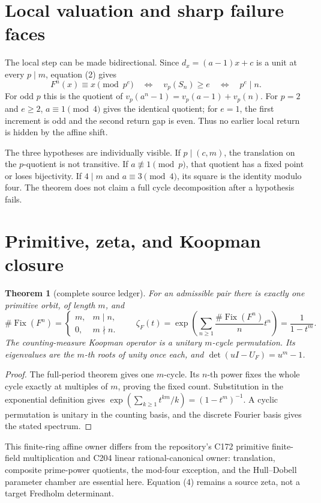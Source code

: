 \documentclass[10pt]{article}
\newtheorem{theorem}{Theorem}
\begin{document}
\section{Local valuation and sharp failure faces}
The local step can be made bidirectional.  Since
$d_x=(a-1)x+c$ is a unit at every $p\mid m$, equation (2) gives
\[
 F^n(x)\equiv x\pmod {p^e}
 \quad\Longleftrightarrow\quad v_p(S_n)\ge e
 \quad\Longleftrightarrow\quad p^e\mid n.             \tag{3}
\]
For odd $p$ this is the quotient of
$v_p(a^n-1)=v_p(a-1)+v_p(n)$.  For $p=2$ and $e\ge2$,
$a\equiv1\pmod4$ gives the identical quotient; for $e=1$, the first
increment is odd and the second return gap is even.  Thus no earlier local
return is hidden by the affine shift.

The three hypotheses are individually visible.  If $p\mid(c,m)$, the
translation on the $p$-quotient is not transitive.  If
$a\not\equiv1\pmod p$, that quotient has a fixed point or loses
bijectivity.  If $4\mid m$ and $a\equiv3\pmod4$, its square is the identity
modulo four.  The theorem does not claim a full cycle decomposition after a
hypothesis fails.

\section{Primitive, zeta, and Koopman closure}
\begin{theorem}[complete source ledger]
For an admissible pair there is exactly one primitive orbit, of length $m$,
and
\[
 \#\operatorname{Fix}(F^n)=
 \begin{cases}m,&m\mid n,\\0,&m\nmid n.\end{cases}
 \qquad
 \zeta_F(t)=\exp\!\left(\sum_{n\ge1}
 \frac{\#\operatorname{Fix}(F^n)}n t^n\right)
 =\frac1{1-t^m}.                                    \tag{4}
\]
The counting-measure Koopman operator is a unitary $m$-cycle permutation.
Its eigenvalues are the $m$-th roots of unity once each, and
$\det(uI-U_F)=u^m-1$.
\end{theorem}
\begin{proof}
The full-period theorem gives one $m$-cycle.  Its $n$-th power fixes the
whole cycle exactly at multiples of $m$, proving the fixed count.  Substitution
in the exponential definition gives
$\exp(\sum_{k\ge1}t^{km}/k)=(1-t^m)^{-1}$.  A cyclic permutation is unitary
in the counting basis, and the discrete Fourier basis gives the stated
spectrum.
\end{proof}
This finite-ring affine owner differs from the repository's C172 primitive
finite-field multiplication and C204 linear rational-canonical owner:
translation, composite prime-power quotients, the mod-four exception, and
the Hull--Dobell parameter chamber are essential here.  Equation (4) remains
a source zeta, not a target Fredholm determinant.
\end{document}
